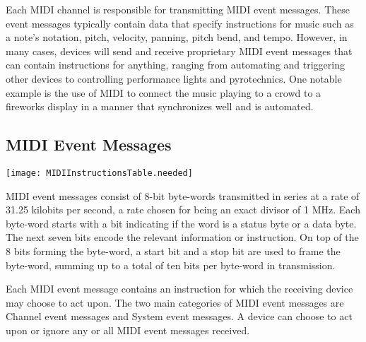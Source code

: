 \documentclass[a4paper,12pt]{report}
\begin{document}
Each MIDI channel is responsible for transmitting MIDI event messages. These event messages typically contain data that specify instructions for music such as a note's notation, pitch, velocity, panning, pitch bend, and tempo. However, in many cases, devices will send and receive proprietary MIDI event messages that can contain instructions for anything, ranging from automating and triggering other devices to controlling performance lights and pyrotechnics. One notable example is the use of MIDI to connect the music playing to a crowd to a fireworks display in a manner that synchronizes well and is automated.

\subsection{MIDI Event Messages}
\texttt{[image: MIDIInstructionsTable.needed]}

MIDI event messages consist of 8-bit byte-words transmitted in series at a rate of 31.25 kilobits per second, a rate chosen for being an exact divisor of 1 MHz. Each byte-word starts with a bit indicating if the word is a status byte or a data byte. The next seven bits encode the relevant information or instruction. On top of the 8 bits forming the byte-word, a start bit and a stop bit are used to frame the byte-word, summing up to a total of ten bits per byte-word in transmission.

Each MIDI event message contains an instruction for which the receiving device may choose to act upon. The two main categories of MIDI event messages are Channel event messages and System event messages. A device can choose to act upon or ignore any or all MIDI event messages received.
\end{document}
